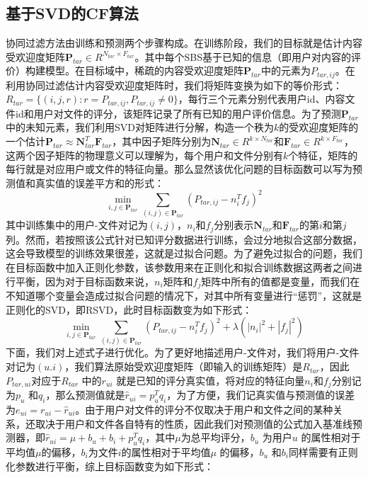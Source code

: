 \documentclass[bachelor]{seuthesis} %
\begin{document}
\begin{Main}
\section{基于SVD的CF算法}
协同过滤方法由训练和预测两个步骤构成。在训练阶段，我们的目标就是估计内容受欢迎度矩阵$\textbf{P}_{tar}\in R^{N_{tar}\times F_{tar}}$。其中每个SBS基于已知的信息（即用户对内容的评价）构建模型。在目标域中，稀疏的内容受欢迎度矩阵$\textbf{P}_{tar}$中的元素为$P_{tar,ij}$。在利用协同过滤估计内容受欢迎度矩阵时，我们将矩阵变换为如下的等价形式：$R_{tar}=\{(i,j,r):r=P_{tar,ij},P_{tar,ij}\neq0\}$，每行三个元素分别代表用户id、内容文件id和用户对文件的评分，该矩阵记录了所有已知的用户评价信息。为了预测$\textbf{P}_{tar}$中的未知元素，我们利用SVD对矩阵进行分解，构造一个秩为$k$的受欢迎度矩阵的一个估计$\textbf{P}_{tar}\approx \textbf{N}_{tar}^T\textbf{F}_{tar}$，其中因子矩阵分别为$\textbf{N}_{tar}\in R^{k\times N_{tar}}$和$\textbf{F}_{tar}\in R^{k\times F_{tar}}$，这两个因子矩阵的物理意义可以理解为，每个用户和文件分别有$k$个特征，矩阵的每行就是对应用户或文件的特征向量。那么显然该优化问题的目标函数可以写为预测值和真实值的误差平方和的形式：
\begin{equation}
\min_{i,j\in\textbf{P}_{tar}}\sum_{(i,j)\in\textbf{P}_{tar}}(P_{tar,ij}-n_i^Tf_j)^2
\end{equation}
其中训练集中的用户-文件对记为$(i,j)$，$n_i$和$f_j$分别表示$\textbf{N}_{tar}$和$\textbf{F}_{tar}$的第$i$和第$j$列。然而，若按照该公式针对已知评分数据进行训练，会过分地拟合这部分数据，这会导致模型的训练效果很差，这就是过拟合问题。为了避免过拟合的问题，我们在目标函数中加入正则化参数，该参数用来在正则化和拟合训练数据这两者之间进行平衡，因为对于目标函数来说，$n_i$矩阵和$f_j$矩阵中所有的值都是变量，而我们在不知道哪个变量会造成过拟合问题的情况下，对其中所有变量进行“惩罚”，这就是正则化的SVD，即RSVD，此时目标函数变为如下形式：
\begin{equation}
\min_{i,j\in\textbf{P}_{tar}}\sum_{(i,j)\in\textbf{P}_{tar}}(P_{tar,ij}-n_i^Tf_j)^2+\lambda(|n_i|^2+|f_j|^2)
\end{equation}
下面，我们对上述式子进行优化。为了更好地描述用户-文件对，我们将用户-文件对记为$(u.i)$，我们算法原始受欢迎度矩阵（即输入的训练矩阵）是$R_{tar}$，因此$P_{tar,ui}$对应于$R_{tar}$ 中的$r_{ui}$ 就是已知的评分真实值，将对应的特征向量$n_i$和$f_j$分别记为$p_u$ 和$q_i$，那么预测值就是$\hat{r}_{ui}=p_u^Tq_i$，为了方便，我们记真实值与预测值的误差为$e_{ui}=r_{ui}-\hat{r}_{ui}$。由于用户对文件的评分不仅取决于用户和文件之间的某种关系，还取决于用户和文件各自特有的性质，因此我们对预测值的公式加入基准线预测器，即$\hat{r}_{ui}=\mu+b_u+b_i+p_u^Tq_i$，其中$\mu$为总平均评分，$b_u$ 为用户$u$ 的属性相对于平均值$\mu$的偏移，$b_i$为文件$i$的属性相对于平均值$\mu$ 的偏移，$b_u$ 和$b_i$同样需要有正则化参数进行平衡，综上目标函数变为如下形式：

\end{Main}
\end{document}
